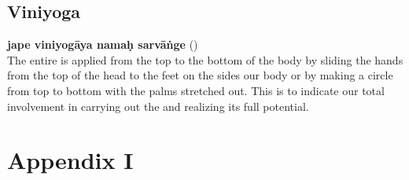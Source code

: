 \documentclass[twoside]{xarticle}
\begin{document}
\subsection{Viniyoga}

\textbf{jape viniyogāya namaḥ sarvāṅge} ()\\
The entire  is applied from the top to the bottom of the body by
sliding the hands from the top of the head to the feet on the sides our body or
by making a circle from top to bottom with the palms stretched out. This is to
indicate our total involvement in carrying out the  and
realizing its full potential.

\clearpage

\appendix

\section{Appendix I}
\thispagestyle{empty}
\end{document}
